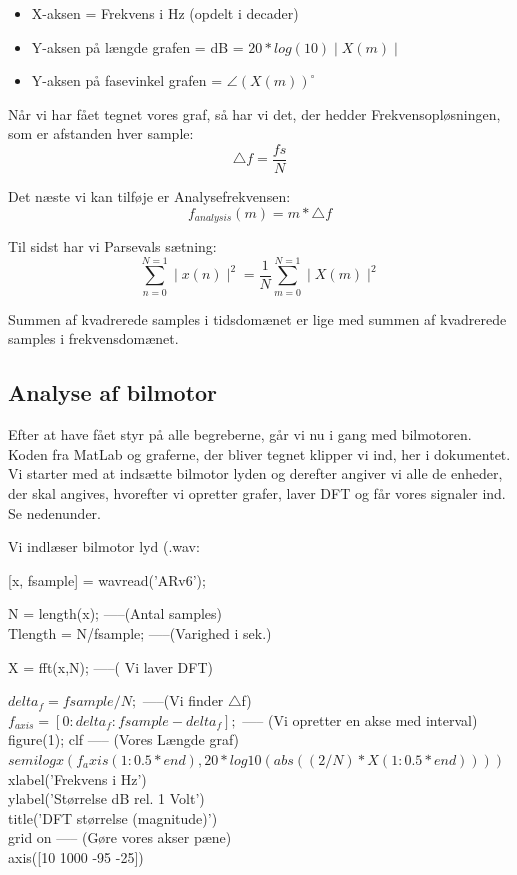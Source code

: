 \documentclass[12pt, letterpaper]{article}
\begin{document}
\begin{itemize}
\item X-aksen = Frekvens i Hz (opdelt i decader)
\item Y-aksen på længde grafen = dB = $ 20*log(10)\mid X(m) \mid$ 
\item Y-aksen på fasevinkel grafen = $\angle (X(m))^{\circ}  $
\end{itemize}

Når vi har fået tegnet vores graf, så har vi det, der hedder Frekvensopløsningen, som er afstanden hver sample: 
$$\bigtriangleup f = \frac{fs}{N} $$

Det næste vi kan tilføje er Analysefrekvensen: 
$$f_{analysis}(m)=m*\bigtriangleup f$$

Til sidst har vi Parsevals sætning: 
$$ \sum\limits_{n=0}^{N=1} \mid x(n) \mid^2 = \frac{1}{N} \sum\limits_{m=0}^{N=1} \mid X(m) \mid^2    $$

Summen af kvadrerede samples i tidsdomænet er lige med summen af kvadrerede samples i frekvensdomænet.


\subsection{Analyse af bilmotor}
Efter at have fået styr på alle begreberne, går vi nu i gang med bilmotoren. Koden fra MatLab og graferne, der bliver tegnet klipper vi ind, her i dokumentet. 
Vi starter med at indsætte bilmotor lyden og derefter angiver vi alle de enheder, der skal angives, hvorefter vi opretter grafer, laver DFT og får vores signaler ind. Se nedenunder. 

Vi indlæser bilmotor lyd (.wav: 

[x, fsample] = wavread('ARv6');

N = length(x);       -----(Antal samples)  \\       
Tlength = N/fsample;     -----(Varighed i sek.)              

X = fft(x,N);   -----( Vi laver DFT)                       

$delta_f = fsample/N;$  -----(Vi finder $\bigtriangleup$f)   \\ 
$f_{axis} = [0:delta_f:fsample-delta_f];$ ----- (Vi opretter en akse med interval)\\ 

figure(1); clf  ----- (Vores Længde graf)    \\   
$semilogx(f_axis(1:0.5*end), 20*log10(abs((2/N)*X(1:0.5*end))))$\\
xlabel('Frekvens i Hz') \\
ylabel('Størrelse dB rel. 1 Volt') \\
title('DFT størrelse (magnitude)') \\
grid on       -----   (Gøre vores akser pæne)   \\   
axis([10 1000 -95 -25]) \\
\end{document}
